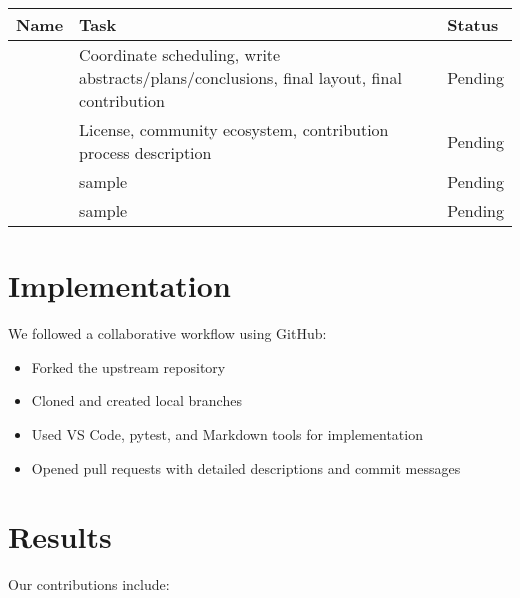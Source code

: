 \documentclass[12pt]{article}
\begin{document}
\begin{longtable}{|p{3cm}|p{7cm}|p{3cm}|}
\hline
\textbf{Name} & \textbf{Task} & \textbf{Status} \\
\hline
 & Coordinate scheduling, write abstracts/plans/conclusions, final layout, final contribution & Pending \\
\hline
 & License, community ecosystem, contribution process description & Pending \\
\hline
 & sample & Pending \\
\hline
 & sample & Pending \\
\hline
\end{longtable}

\section{Implementation}

We followed a collaborative workflow using GitHub:

\begin{itemize}
    \item Forked the upstream repository
    \item Cloned and created local branches
    \item Used VS Code, pytest, and Markdown tools for implementation
    \item Opened pull requests with detailed descriptions and commit messages
\end{itemize}

\section{Results}

Our contributions include:

\end{document}
